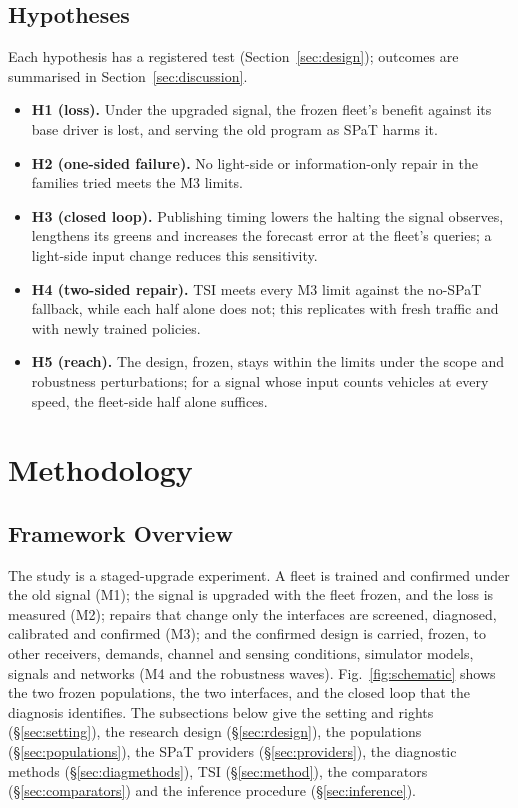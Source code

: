 \subsection{Hypotheses}
Each hypothesis has a registered test (Section~\ref{sec:design}); outcomes are summarised in Section~\ref{sec:discussion}.
\begin{itemize}\setlength\itemsep{1pt}
\item \textbf{H1 (loss).} Under the upgraded signal, the frozen fleet's benefit against its base driver is lost, and serving the old
program as SPaT harms it.
\item \textbf{H2 (one-sided failure).} No light-side or information-only repair in the families tried meets the M3 limits.
\item \textbf{H3 (closed loop).} Publishing timing lowers the halting the signal observes, lengthens its greens and increases the
forecast error at the fleet's queries; a light-side input change reduces this sensitivity.
\item \textbf{H4 (two-sided repair).} TSI meets every M3 limit against the no-SPaT fallback, while each half alone does not; this
replicates with fresh traffic and with newly trained policies.
\item \textbf{H5 (reach).} The design, frozen, stays within the limits under the scope and robustness perturbations; for a signal whose
input counts vehicles at every speed, the fleet-side half alone suffices.
\end{itemize}

\section{Methodology}\label{sec:methodology}
\subsection{Framework Overview}
The study is a staged-upgrade experiment. A fleet is trained and confirmed under the old signal (M1); the signal is upgraded with the fleet
frozen, and the loss is measured (M2); repairs that change only the interfaces are screened, diagnosed, calibrated and confirmed (M3); and
the confirmed design is carried, frozen, to other receivers, demands, channel and sensing conditions, simulator models, signals and
networks (M4 and the robustness waves). Fig.~\ref{fig:schematic} shows the two frozen populations, the two interfaces, and the closed loop
that the diagnosis identifies. The subsections below give the setting and rights (§\ref{sec:setting}), the research design
(§\ref{sec:rdesign}), the populations (§\ref{sec:populations}), the SPaT providers (§\ref{sec:providers}), the diagnostic methods
(§\ref{sec:diagmethods}), TSI (§\ref{sec:method}), the comparators (§\ref{sec:comparators}) and the inference procedure
(§\ref{sec:inference}).

